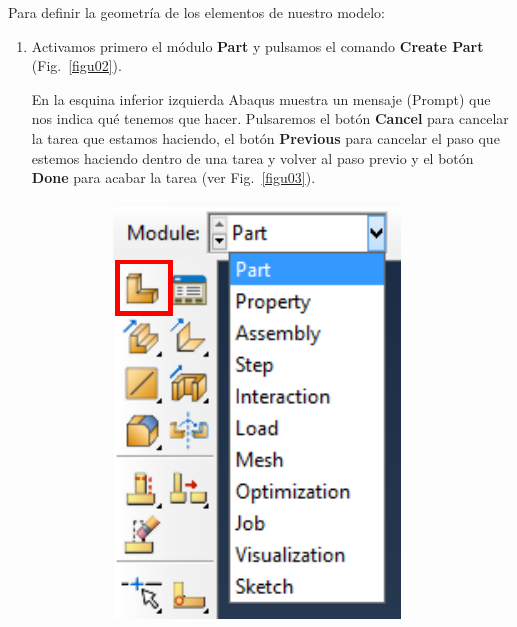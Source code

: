 Para definir la geometría de los elementos de nuestro modelo:
\begin{enumerate}
\item Activamos primero el módulo \textbf{Part} y pulsamos el comando
  \textbf{Create Part} (Fig.~\ref{figu02}).

  En la esquina inferior izquierda Abaqus muestra un mensaje (Prompt)
  que nos indica qué tenemos que hacer. Pulsaremos el botón
  \textbf{Cancel} para cancelar la tarea que estamos haciendo, el
  botón \textbf{Previous} para cancelar el paso que estemos haciendo
  dentro de una tarea y volver al paso previo y el botón \textbf{Done}
  para acabar la tarea (ver Fig.~\ref{figu03}).

\begin{figure}[H]
  \centering
  \begin{subfigure}{0.25\textwidth}
    \includegraphics[width=\textwidth]{./body/images/imagen02.pdf}

\end{subfigure}
\end{figure}
\end{enumerate}
